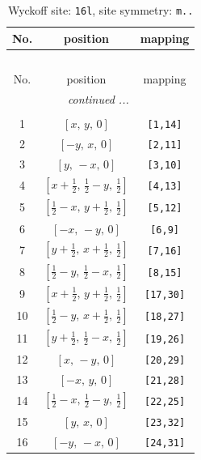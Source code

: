 \documentclass[fleqn,8pt]{jsarticle}
\begin{document}
\renewcommand{\arraystretch}{1.2}
\begin{longtable}{ccc}
\caption{Wyckoff site: {\tt 16l}, site symmetry: {\tt m..}}
 \\
 \hline \hline
No. & position & mapping \\ \hline \endfirsthead

\multicolumn{2}{l}{\tablename\ \thetable{}} \\
 \hline \hline
No. & position & mapping \\ \hline \endhead

 \hline \hline
\multicolumn{2}{r}{\footnotesize\it continued ...} \\ \endfoot

 \hline \hline
\multicolumn{2}{r}{} \\ \endlastfoot

1 & $\left[ x,\, y,\, 0 \right]$ & {\tt [1,14]} \\ \hline
2 & $\left[ - y,\, x,\, 0 \right]$ & {\tt [2,11]} \\ \hline
3 & $\left[ y,\, - x,\, 0 \right]$ & {\tt [3,10]} \\ \hline
4 & $\left[ x + \frac{1}{2},\, \frac{1}{2} - y,\, \frac{1}{2} \right]$ & {\tt [4,13]} \\ \hline
5 & $\left[ \frac{1}{2} - x,\, y + \frac{1}{2},\, \frac{1}{2} \right]$ & {\tt [5,12]} \\ \hline
6 & $\left[ - x,\, - y,\, 0 \right]$ & {\tt [6,9]} \\ \hline
7 & $\left[ y + \frac{1}{2},\, x + \frac{1}{2},\, \frac{1}{2} \right]$ & {\tt [7,16]} \\ \hline
8 & $\left[ \frac{1}{2} - y,\, \frac{1}{2} - x,\, \frac{1}{2} \right]$ & {\tt [8,15]} \\ \hline
9 & $\left[ x + \frac{1}{2},\, y + \frac{1}{2},\, \frac{1}{2} \right]$ & {\tt [17,30]} \\ \hline
10 & $\left[ \frac{1}{2} - y,\, x + \frac{1}{2},\, \frac{1}{2} \right]$ & {\tt [18,27]} \\ \hline
11 & $\left[ y + \frac{1}{2},\, \frac{1}{2} - x,\, \frac{1}{2} \right]$ & {\tt [19,26]} \\ \hline
12 & $\left[ x,\, - y,\, 0 \right]$ & {\tt [20,29]} \\ \hline
13 & $\left[ - x,\, y,\, 0 \right]$ & {\tt [21,28]} \\ \hline
14 & $\left[ \frac{1}{2} - x,\, \frac{1}{2} - y,\, \frac{1}{2} \right]$ & {\tt [22,25]} \\ \hline
15 & $\left[ y,\, x,\, 0 \right]$ & {\tt [23,32]} \\ \hline
16 & $\left[ - y,\, - x,\, 0 \right]$ & {\tt [24,31]} \\
\end{longtable}
\end{document}
